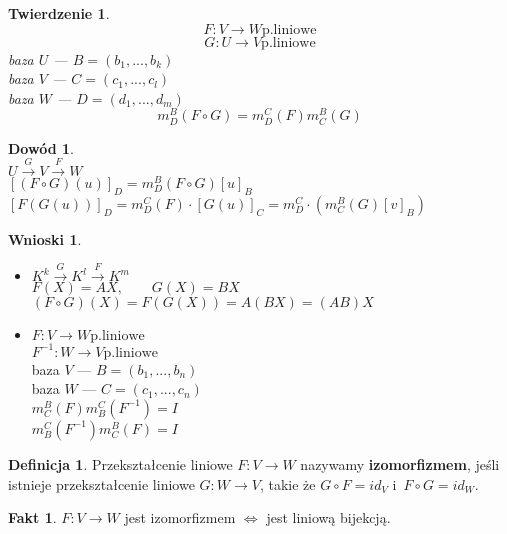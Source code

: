 \documentclass[12pt,a4paper]{article}
\theoremstyle{plain}
\newtheorem{tw}{Twierdzenie}[section]
\theoremstyle{definition}
\newtheorem{ft}{Fakt}[section]
\theoremstyle{definition}
\newtheorem{df}{Definicja}[section]
\theoremstyle{definition}
\theoremstyle{definition}
\newtheorem*{dd}{Dowód}
\theoremstyle{definition}
\theoremstyle{definition}
\theoremstyle{definition}
\theoremstyle{definition}
\theoremstyle{definition}
\newtheorem*{wn}{Wnioski}
\begin{document}
\begin{tw}
    \[ F: V \rightarrow W \mathrm{p. liniowe} \]
    \[ G: U \rightarrow V \mathrm{p. liniowe} \]
    baza $U$ --- $B=(b_1, ..., b_k)$ \\
    baza $V$ --- $C=(c_1, ..., c_l)$ \\
    baza $W$ --- $D=(d_1, ..., d_m)$ \\
    \[m^B_D(F\circ G)=m^C_D(F)m^B_C(G)\]
\end{tw}

\begin{dd} 
    ~\\
    $U \overset{G}{\longrightarrow}  V \overset{F}{\longrightarrow} W$ \\ 
    $[(F\circ G)(u)]_D = m_D^B(F\circ G)[u]_B$ \\
    $[F(G(u))]_D = m_D^C(F) \cdot [G(u)]_C = m_D^C \cdot (m_C^B(G)[v]_B)$
\end{dd}

\begin{wn} \hfill
    \begin{itemize}
        \item $K^k \overset{G}{\longrightarrow} K^l \overset{F}{\longrightarrow} K^m $\\
              $ F(X) = AX, \qquad G(X) = BX $ \\ 
              $(F\circ G)(X) = F(G(X)) = A(BX) = (AB)X$
        \item $ F: V \rightarrow W \mathrm{ p.liniowe} $ \\
              $ F^{-1}: W \rightarrow V \mathrm{ p. liniowe} $ \\
              baza $V$ --- $B=(b_1, ..., b_n)$ \\
              baza $W$ --- $C=(c_1, ..., c_n)$ \\
              $m^B_C(F)m^C_B(F^{-1}) = I $ \\
              $m^C_B(F^{-1})m^B_C(F) = I $
    \end{itemize}
\end{wn}

\begin{df}
    Przekształcenie liniowe $F: V \rightarrow W$ nazywamy
    \textbf{izomorfizmem}, jeśli istnieje przekształcenie
    liniowe $G: W\rightarrow V$, takie że $G\circ F = id_V$
    i~$F\circ G=id_W$.
\end{df}

\begin{ft}
    $F: V \rightarrow W$ jest izomorfizmem $\Leftrightarrow$ jest liniową
  bijekcją.
\end{ft}
\end{document}
